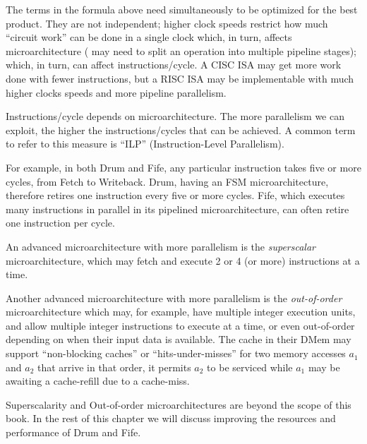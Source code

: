 The terms in the formula above need simultaneously to be optimized for
the best product.  They are not independent; higher clock speeds
restrict how much ``circuit work'' can be done in a single clock
which, in turn, affects microarchitecture ({\eg} may need to split an
operation into multiple pipeline stages); which, in turn, can affect
instructions/cycle.  A CISC ISA may get more work done with fewer
instructions, but a RISC ISA may be implementable with much higher
clocks speeds and more pipeline parallelism.

Instructions/cycle depends on microarchitecture.  The more parallelism
we can exploit, the higher the instructions/cycles that can be
achieved.  A common term to refer to this measure is ``ILP''
(Instruction-Level Parallelism).

For example, in both Drum and Fife, any particular instruction takes
five or more cycles, from Fetch to Writeback.  Drum, having an FSM
microarchitecture, therefore retires one instruction every five or
more cycles.  Fife, which executes many instructions in parallel in
its pipelined microarchitecture, can often retire one instruction per
cycle.


An advanced microarchitecture with more parallelism is the
\emph{superscalar} microarchitecture, which may fetch and execute 2 or
4 (or more) instructions at a time.



Another advanced microarchitecture with more parallelism is the
\emph{out-of-order} microarchitecture which may, for example, have
multiple integer execution units, and allow multiple integer
instructions to execute at a time, or even out-of-order depending on
when their input data is available.  The cache in their DMem may
support ``non-blocking caches'' or ``hits-under-misses'' {\ie} for two
memory accesses $a_1$ and $a_2$ that arrive in that order, it permits
$a_2$ to be serviced while $a_1$ may be awaiting a cache-refill due to
a cache-miss.

Superscalarity and Out-of-order microarchitectures are beyond the
scope of this book.  In the rest of this chapter we will discuss
improving the resources and performance of Drum and Fife.

